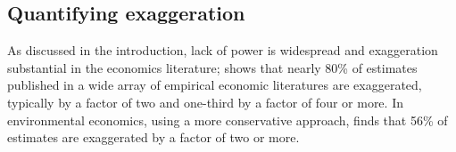 \documentclass[usletter, 12pt]{article}
\begin{document}
		 
	                \subsection{Quantifying exaggeration}
	                
	                	 	As discussed in the introduction, lack of power is widespread and exaggeration substantial in the economics literature; \cite{ioannidis_power_2017} shows that nearly 80\% of estimates published in a wide array of empirical economic literatures are exaggerated, typically by a factor of two and one-third by a factor of four or more. In environmental economics, using a more conservative approach, \cite{ferraro_featureis_2020} finds that 56\% of estimates are exaggerated by a factor of two or more.
			
\end{document}
